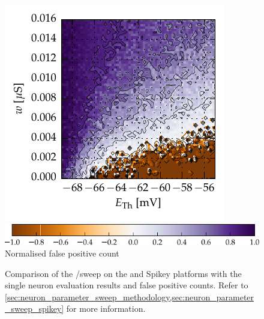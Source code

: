 \begin{figure}[p]
{		\includegraphics[trim=7mm 3mm 2mm 2.2mm,clip]{media/chp5/spikey/plot_0_fp_n_2d_spikey_small.pdf}%
		\label{fig:exp2_fp_spikey}
	}
	\hspace*{5.5mm}\includegraphics{media/chp5/colorbar_fp_fn.pdf}
	{\footnotesize Normalised false positive count \nFP}
	\caption[Spikey parameter sweep overview]{Comparison of the \ETh/\wsyn sweep on the \NEST and Spikey platforms with the single neuron evaluation results and false positive counts. Refer to \cref{sec:neuron_parameter_sweep_methodology,sec:neuron_parameter_sweep_spikey} for more information.}
	\label{fig:exp2_sweepI}
\end{figure}


